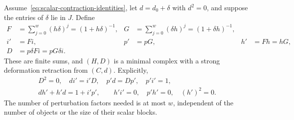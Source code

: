 \begin{theorem}
\label{thm:finite-hpl}
Assume~\eqref{eq:scalar-contraction-identities}, let $d=d_0+\delta$ with
$d^2=0$, and suppose the entries of $\delta$ lie in $J$.  Define
\begin{align}
 F&=\sum_{j=0}^{w}(h\delta)^j=(1+h\delta)^{-1},&
 G&=\sum_{j=0}^{w}(\delta h)^j=(1+\delta h)^{-1},
 \label{eq:finite-series}\\
 i'&=Fi,& p'&=pG,& h'&=Fh=hG,\nonumber\\
 D&=p\delta Fi=pG\delta i.&&
 \label{eq:finite-hpl-maps}
\end{align}
These are finite sums, and $(H,D)$ is a minimal complex with a strong
deformation retraction from $(C,d)$.  Explicitly,
\begin{gather}
 D^2=0,\quad di'=i'D,\quad p'd=Dp',\quad p'i'=1,
 \label{eq:lifted-chain-identities}\\
 dh'+h'd=1+i'p',\qquad h'i'=0,\quad p'h'=0,\quad (h')^2=0.
 \label{eq:lifted-retraction-identities}
\end{gather}
The number of perturbation factors needed is at most $w$, independent of
the number of objects or the size of their scalar blocks.
\end{theorem}

